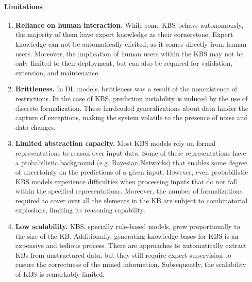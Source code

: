 \paragraph{Limitations}
\begin{enumerate} [start=1,label={\bfseries L\arabic*.}]
    \item \textbf{Reliance on human interaction.} \label{dl_intro_kbs_L_human} While some KBS behave autonomously, the majority of them have expert knowledge as their cornerstone.  Expert knowledge can not be automatically elicited, as it comes directly from human users. Moreover, the implication of human users within the KBS may not be only limited to their deployment, but can also be required for validation, extension, and maintenance. 
    \item \textbf{Brittleness.}\label{dl_into_kbs_L_brittle} In DL models, brittleness was a result of the nonexistence of restrictions. In the case of KBS, prediction instability is induced by the use of discrete formalization. These hardcoded generalizations about data hinder the capture of exceptions, making the system volatile to the presence of noise and data changes.  
    \item \textbf{Limited abstraction capacity.}\label{dl_into_kbs_L_abstraction} Most KBS models rely on formal representations to reason over input data. Some of these representations have a probabilistic background (e.g. Bayesian Networks) that enables some degree of uncertainty on the predictions of a given input. However, even probabilistic KBS models experience difficulties when processing inputs that do not fall within the specified representations. Moreover, the number of formalizations required to cover over all the elements in the KB are subject to combinatorial explosions, limiting its reasoning capability.
    \item \textbf{Low scalability.}\label{dl_into_kbs_L_scalability} KBS, specially rule-based models, grow proportionally to the size of the KB. Additionally, generating knowledge bases for KBS is an expensive and tedious process. There are approaches to automatically extract KBs from unstructured data, but they still require expert supervision to ensure the correctness of the mined information. Subsequently, the scalability of KBS is remarkably limited.  
\end{enumerate}

